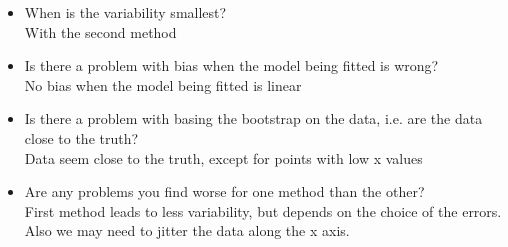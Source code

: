 \documentclass[11pt]{article}\usepackage[]{graphicx}\usepackage[]{color}
\begin{document}
\begin{itemize}
\item When is the variability smallest?\\
With the second method
\item Is there a problem with bias when the model being fitted is wrong?\\ 
No bias when the model being fitted is linear
\item Is there a problem with basing the bootstrap on the data, i.e. are the data close to the truth? \\
Data seem close to the truth, except for points with low x values
\item Are any problems you find worse for one method than the other?\\
First method leads to less variability, but depends on the choice of the errors. Also we may need to jitter the data along the x axis.
\end{itemize}
\end{document}
